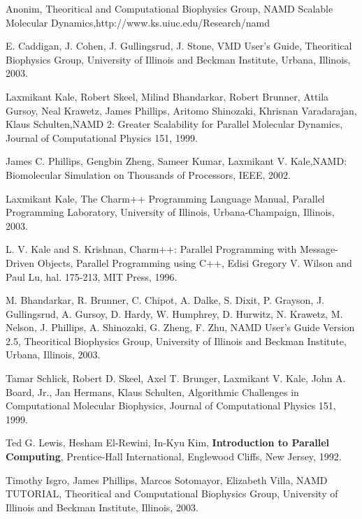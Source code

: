 \documentclass[aps,showpacs,pre,floatfix]{revtex4}
\begin{document}
\begin{thebibliography}{99}


Anonim, Theoritical and Computational Biophysics Group,
NAMD Scalable Molecular
Dynamics,http://www.ks.uiuc.edu/Research/namd

 E. Caddigan, J. Cohen, J. Gullingsrud, J.
Stone, VMD User's Guide, Theoritical Biophysics Group, University
of Illinois and Beckman Institute, Urbana, Illinois, 2003.

Laxmikant Kale, Robert Skeel, Milind
Bhandarkar, Robert Brunner, Attila Gursoy, Neal Krawetz, James
Phillips, Aritomo Shinozaki, Khrisnan Varadarajan, Klaus
Schulten,NAMD 2: Greater Scalability for Parallel Molecular
Dynamics, Journal of Computational Physics 151, 1999.

James C. Phillips, Gengbin Zheng, Sameer
Kumar, Laxmikant V. Kale,NAMD: Biomolecular Simulation on
Thousands of Processors, IEEE, 2002.

Laxmikant Kale, The Charm++
Programming Language Manual, Parallel Programming Laboratory,
University of Illinois, Urbana-Champaign, Illinois, 2003.

L. V. Kale and S. Krishnan,
Charm++: Parallel Programming with Message-Driven Objects,
Parallel Programming using C++, Edisi Gregory V. Wilson and Paul
Lu, hal. 175-213, MIT Press, 1996.

M. Bhandarkar, R. Brunner, C. Chipot, A. Dalke, S.
Dixit, P. Grayson, J. Gullingsrud, A. Gursoy, D. Hardy, W.
Humphrey, D. Hurwitz, N. Krawetz, M. Nelson, J. Phillips, A.
Shinozaki, G. Zheng, F. Zhu, NAMD User's Guide Version 2.5,
Theoritical Biophysics Group, University of Illinois and Beckman
Institute, Urbana, Illinois, 2003.

Tamar Schlick, Robert D. Skeel, Axel T.
Brunger, Laxmikant V. Kale, John A. Board, Jr., Jan  Hermans,
Klaus Schulten, Algorithmic Challenges in Computational Molecular
Biophysics, Journal of Computational Physics 151, 1999.

Ted G. Lewis, Hesham El-Rewini, In-Kyu Kim,
\textbf{Introduction to Parallel Computing}, Prentice-Hall
International, Englewood Cliffs, New Jersey, 1992.

Timothy Isgro, James Phillips, Marcos
Sotomayor, Elizabeth Villa, NAMD TUTORIAL, Theoritical and
Computational Biophysics Group, University of Illinois and Beckman
Institute, Illinois, 2003.

\end{thebibliography}
\end{document}
